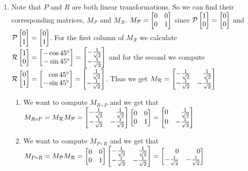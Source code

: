 \begin{exercises}
\begin{problist}
		\begin{solution}
		    \begin{enumerate}
			\item 
				Note that $P$ and $R$ are both linear transformations. So we can find their corresponding matrices, $M_{\mathcal P}$ and $M_{\mathcal R}$. 
				$M_{\mathcal P}=\mat{0&0\\0&1}$ since $\mathcal P\mat{1\\0}=\mat{0\\0}$ and $\mathcal P\mat{0\\1}=\mat{0\\1}$.
				For the first column of $M_{\mathcal R}$ we calculate $\mathcal R\mat{1\\0}=\mat{-\cos{45^{\circ}}\\-\sin{45^{\circ}}}=\mat{-\tfrac{1}{\sqrt{2}}\\-\tfrac{1}{\sqrt{2}}}$
				and for the second we compute $\mathcal R\mat{0\\1}=\mat{\cos{45^{\circ}}\\-\sin{45^{\circ}}}=\mat{\tfrac{1}{\sqrt{2}}\\-\tfrac{1}{\sqrt{2}}}$.
				Thus we get $M_{\mathcal R}=\mat{-\tfrac{1}{\sqrt{2}}&\tfrac{1}{\sqrt{2}}\\-\tfrac{1}{\sqrt{2}}&-\tfrac{1}{\sqrt{2}}}$

				\begin{enumerate}
					\item We want to compute $M_{R\circ P}$ and we get that $M_{R\circ P}= M_\mathcal R M_{\mathcal P}=\mat{-\tfrac{1}{\sqrt{2}}&\tfrac{1}{\sqrt{2}}\\-\tfrac{1}{\sqrt{2}}&-\tfrac{1}{\sqrt{2}}}\mat{0&0\\0&1}=\mat{0&\tfrac{1}{\sqrt{2}}\\0&-\tfrac{1}{\sqrt{2}}}$

					\item We want to compute $M_{P\circ R}$ and we get that $M_{P\circ R}= M_\mathcal P M_{\mathcal R}=\mat{0&0\\0&1}\mat{-\tfrac{1}{\sqrt{2}}&\tfrac{1}{\sqrt{2}}\\-\tfrac{1}{\sqrt{2}}&-\tfrac{1}{\sqrt{2}}}=\mat{0&0\\-\tfrac{1}{\sqrt{2}}&-\tfrac{1}{\sqrt{2}}}$


\end{enumerate}
\end{enumerate}
\end{solution}
\end{problist}
\end{exercises}
